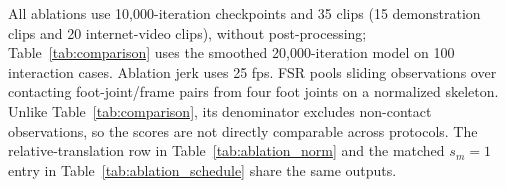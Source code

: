 All ablations use 10,000-iteration checkpoints and 35 clips (15 demonstration clips and 20 internet-video clips), without post-processing; Table~\ref{tab:comparison} uses the smoothed 20,000-iteration model on 100 interaction cases. Ablation jerk uses 25 fps. FSR pools sliding observations over contacting foot-joint/frame pairs from four foot joints on a normalized skeleton. Unlike Table~\ref{tab:comparison}, its denominator excludes non-contact observations, so the scores are not directly comparable across protocols. The relative-translation row in Table~\ref{tab:ablation_norm} and the matched $s_m=1$ entry in Table~\ref{tab:ablation_schedule} share the same outputs.

